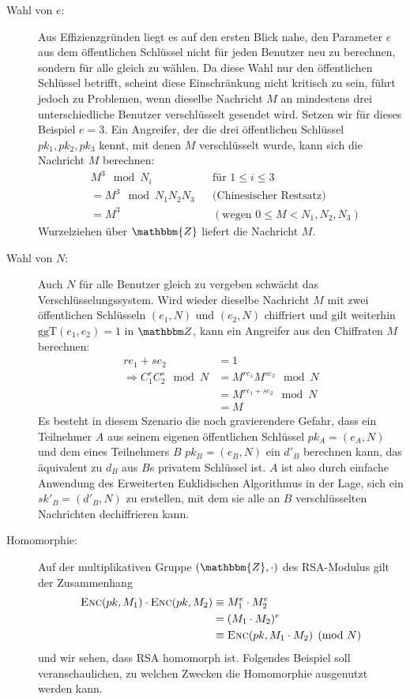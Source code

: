 \begin{description}
    \item[Wahl von $e$:] Aus Effizienzgründen liegt es auf den ersten Blick nahe, den Parameter $e$ aus dem öffentlichen Schlüssel nicht für jeden Benutzer neu
    zu berechnen, sondern für alle gleich zu wählen. Da diese Wahl nur den öffentlichen Schlüssel betrifft, scheint diese Einschränkung nicht kritisch zu sein,
    führt jedoch zu Problemen, wenn dieselbe Nachricht $M$ an mindestens drei unterschiedliche Benutzer verschlüsselt gesendet wird. Setzen wir für dieses Beispiel $e =
    3$. Ein Angreifer, der die drei öffentlichen Schlüssel $pk_1, pk_2, pk_3$ kennt, mit denen $M$ verschlüsselt wurde, kann sich die Nachricht $M$ berechnen:
    \begin{align*}
    & M^3 \mod N_i  && \text{für } 1 \leq i \leq 3\\
    &= M^3 \mod N_1N_2N_3  && \text{(Chinesischer Restsatz)}\\
    &= M^3 && (\text{wegen } 0 \leq M < N_1,N_2,N_3)
    \end{align*}
    Wurzelziehen über $\mathbbm{Z}$ liefert die Nachricht $M$.
    
    \item[Wahl von $N$:] Auch $N$ für alle Benutzer gleich zu vergeben schwächt das Verschlüsselungssystem. Wird wieder dieselbe Nachricht $M$ mit zwei
    öffentlichen Schlüsseln $(e_1, N)$ und $(e_2, N)$ chiffriert und gilt weiterhin $\text{ggT}(e_1, e_2) = 1$ in $\Z{}$, kann ein Angreifer aus den Chiffraten
    $M$ berechnen:
    \begin{align*}
    re_1 + se_2 & = 1\\ 
    \Longrightarrow C_1^rC_2^s \mod N &= M^{re_1}M^{se_2} \mod N\\
    &= M^{re_1 + se_2} \mod N\\
    &= M
    \end{align*}
    Es besteht in diesem Szenario die noch gravierendere Gefahr, dass ein Teilnehmer $A$ aus seinem eigenen öffentlichen Schlüssel $pk_A = (e_A, N)$ und
    dem eines Teilnehmers $B$ $pk_B = (e_B, N)$ ein $d'_B$ berechnen kann, das äquivalent zu $d_B$ aus $B$s privatem Schlüssel ist. $A$ ist also durch einfache
    Anwendung des Erweiterten Euklidischen Algorithmus in der Lage, sich ein $sk'_B = (d'_B, N)$ zu erstellen, mit dem sie alle an $B$ verschlüsselten    
    Nachrichten dechiffrieren kann.
    
    \item[Homomorphie:] Auf der multiplikativen Gruppe $(\mathbbm{Z}, \cdot)$ des RSA-Modulus gilt der Zusammenhang
         \begin{equation*}
		\begin{split}
     			\textsc{Enc}(pk, M_1) \cdot \textsc{Enc}(pk, M_2) 	&\equiv M_1^e \cdot M_2^e\\
     										&= (M_1 \cdot M_2)^e\\
     										&\equiv \textsc{Enc}(pk, M_1 \cdot M_2) \pmod N
		\end{split}
     	\end{equation*}
    und wir sehen, dass RSA homomorph ist. 
    Folgendes Beispiel soll veranschaulichen, zu welchen Zwecken die Homomorphie ausgenutzt werden kann.
    

\end{description}
